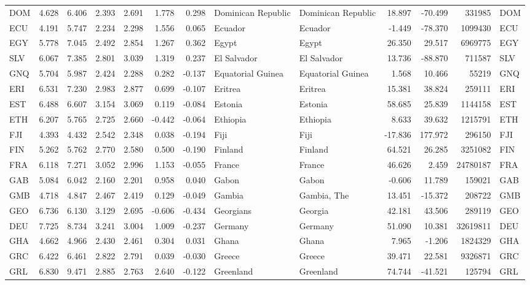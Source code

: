 \begin{tabular}{lrrrrrrllrrrl}
DOM & 4.628 & 6.406 & 2.393 & 2.691 & 1.778 & 0.298 & Dominican Republic & Dominican Republic & 18.897 & -70.499 & 331985 & DOM \\
ECU & 4.191 & 5.747 & 2.234 & 2.298 & 1.556 & 0.065 & Ecuador & Ecuador & -1.449 & -78.370 & 1099430 & ECU \\
EGY & 5.778 & 7.045 & 2.492 & 2.854 & 1.267 & 0.362 & Egypt & Egypt & 26.350 & 29.517 & 6969775 & EGY \\
SLV & 6.067 & 7.385 & 2.801 & 3.039 & 1.319 & 0.237 & El Salvador & El Salvador & 13.736 & -88.870 & 711587 & SLV \\
GNQ & 5.704 & 5.987 & 2.424 & 2.288 & 0.282 & -0.137 & Equatorial Guinea & Equatorial Guinea & 1.568 & 10.466 & 55219 & GNQ \\
ERI & 6.531 & 7.230 & 2.983 & 2.877 & 0.699 & -0.107 & Eritrea & Eritrea & 15.381 & 38.824 & 259111 & ERI \\
EST & 6.488 & 6.607 & 3.154 & 3.069 & 0.119 & -0.084 & Estonia & Estonia & 58.685 & 25.839 & 1144158 & EST \\
ETH & 6.207 & 5.765 & 2.725 & 2.660 & -0.442 & -0.064 & Ethiopia & Ethiopia & 8.633 & 39.632 & 1215791 & ETH \\
FJI & 4.393 & 4.432 & 2.542 & 2.348 & 0.038 & -0.194 & Fiji & Fiji & -17.836 & 177.972 & 296150 & FJI \\
FIN & 5.262 & 5.762 & 2.770 & 2.580 & 0.500 & -0.190 & Finland & Finland & 64.521 & 26.285 & 3251082 & FIN \\
FRA & 6.118 & 7.271 & 3.052 & 2.996 & 1.153 & -0.055 & France & France & 46.626 & 2.459 & 24780187 & FRA \\
GAB & 5.084 & 6.042 & 2.160 & 2.201 & 0.958 & 0.040 & Gabon & Gabon & -0.606 & 11.789 & 159021 & GAB \\
GMB & 4.718 & 4.847 & 2.467 & 2.419 & 0.129 & -0.049 & Gambia & Gambia, The & 13.451 & -15.372 & 208722 & GMB \\
GEO & 6.736 & 6.130 & 3.129 & 2.695 & -0.606 & -0.434 & Georgians & Georgia & 42.181 & 43.506 & 289119 & GEO \\
DEU & 7.725 & 8.734 & 3.241 & 3.004 & 1.009 & -0.237 & Germany & Germany & 51.090 & 10.381 & 32619811 & DEU \\
GHA & 4.662 & 4.966 & 2.430 & 2.461 & 0.304 & 0.031 & Ghana & Ghana & 7.965 & -1.206 & 1824329 & GHA \\
GRC & 6.422 & 6.461 & 2.822 & 2.791 & 0.039 & -0.030 & Greece & Greece & 39.471 & 22.581 & 9326871 & GRC \\
GRL & 6.830 & 9.471 & 2.885 & 2.763 & 2.640 & -0.122 & Greenland & Greenland & 74.744 & -41.521 & 125794 & GRL \\

\end{tabular}
